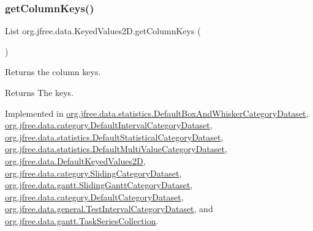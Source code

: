 \mbox{\label{interfaceorg_1_1jfree_1_1data_1_1_keyed_values2_d_af6b8780fee7cccdb967fc0f199398615}} 
\subsubsection{\texorpdfstring{get\+Column\+Keys()}{getColumnKeys()}}
{\footnotesize\ttfamily List org.\+jfree.\+data.\+Keyed\+Values2\+D.\+get\+Column\+Keys (\begin{DoxyParamCaption}{ }\end{DoxyParamCaption})}

Returns the column keys.

\begin{DoxyReturn}{Returns}
The keys. 
\end{DoxyReturn}


Implemented in \mbox{\hyperlink{classorg_1_1jfree_1_1data_1_1statistics_1_1_default_box_and_whisker_category_dataset_a0d4ff5c831a0e65c1b9658d00d04930d}{org.\+jfree.\+data.\+statistics.\+Default\+Box\+And\+Whisker\+Category\+Dataset}}, \mbox{\hyperlink{classorg_1_1jfree_1_1data_1_1category_1_1_default_interval_category_dataset_a1601fe05521b19269fc838d371907613}{org.\+jfree.\+data.\+category.\+Default\+Interval\+Category\+Dataset}}, \mbox{\hyperlink{classorg_1_1jfree_1_1data_1_1statistics_1_1_default_statistical_category_dataset_a7b6adfe3285ed140fc188ab1dbd154d7}{org.\+jfree.\+data.\+statistics.\+Default\+Statistical\+Category\+Dataset}}, \mbox{\hyperlink{classorg_1_1jfree_1_1data_1_1statistics_1_1_default_multi_value_category_dataset_aa5e1211afffe37c4d8d6f25e0da9f045}{org.\+jfree.\+data.\+statistics.\+Default\+Multi\+Value\+Category\+Dataset}}, \mbox{\hyperlink{classorg_1_1jfree_1_1data_1_1_default_keyed_values2_d_ae390bd83ecd242c0e90eee1d8adede7a}{org.\+jfree.\+data.\+Default\+Keyed\+Values2D}}, \mbox{\hyperlink{classorg_1_1jfree_1_1data_1_1category_1_1_sliding_category_dataset_adfd4f4d9f2ead4df88b5793517429ddf}{org.\+jfree.\+data.\+category.\+Sliding\+Category\+Dataset}}, \mbox{\hyperlink{classorg_1_1jfree_1_1data_1_1gantt_1_1_sliding_gantt_category_dataset_a5a6d9404ac2413409fe2c046a8c758df}{org.\+jfree.\+data.\+gantt.\+Sliding\+Gantt\+Category\+Dataset}}, \mbox{\hyperlink{classorg_1_1jfree_1_1data_1_1category_1_1_default_category_dataset_aca704a2ac8b38d61e38b2c0e843024f0}{org.\+jfree.\+data.\+category.\+Default\+Category\+Dataset}}, \mbox{\hyperlink{classorg_1_1jfree_1_1data_1_1general_1_1_test_interval_category_dataset_a1b13db9fa7117272e3772074064ee5f2}{org.\+jfree.\+data.\+general.\+Test\+Interval\+Category\+Dataset}}, and \mbox{\hyperlink{classorg_1_1jfree_1_1data_1_1gantt_1_1_task_series_collection_a7d5753768700a7a2e33f6e2918aa6ecd}{org.\+jfree.\+data.\+gantt.\+Task\+Series\+Collection}}.


